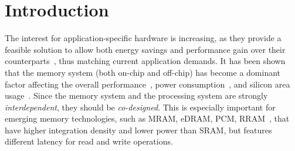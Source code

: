 \section{Introduction}
The interest for application-specific hardware is increasing, as they provide a feasible solution to allow both energy savings and performance gain over their counterparts~\cite{hameed2010understanding}, thus matching current application demands.
It has been shown that the memory system (both on-chip and off-chip) has become a dominant factor affecting the overall performance~\cite{williams2009roofline}, power consumption~\cite{dayarathna2015data}, and silicon area usage~\cite{oh2009analytical}. Since the memory system and the processing system are strongly \textit{interdependent}, they should be \textit{co-designed}. This is especially important for emerging memory technologies, such as MRAM, eDRAM, PCM, RRAM~\cite{mem2016}, that have higher integration density and lower power than SRAM, but features different latency for read and write operations.

%

